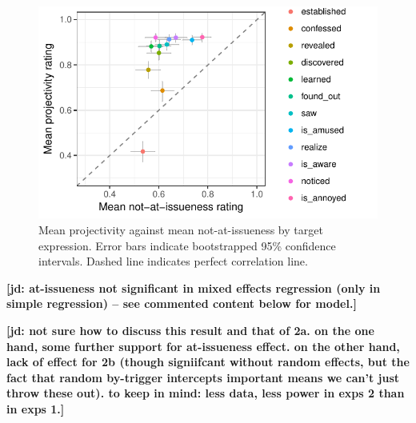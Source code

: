 \documentclass[11pt,fleqn]{article}
\newcommand{\6}{\mbox{$[\hspace*{-.6mm}[$}}
\newcommand{\9}{\mbox{$]\hspace*{-.6mm}]$}}
\newcommand{\jd}[1]{\textbf{\color{Green}[jd: #1]}}
\begin{document}
\begin{figure}[!h]

\begin{center}
\includegraphics[width=12cm]{../results/exp2b/graphs/ai-proj-bytrigger}
\end{center}

\caption{Mean projectivity against mean not-at-issueness by target expression. Error bars indicate bootstrapped 95\% confidence intervals. Dashed line indicates perfect correlation line.}
\label{fig:f-proj-ai-2b}
\end{figure}

\jd{at-issueness not significant in mixed effects regression (only in simple regression) -- see commented content below for model.}


%
%
%
%
%

\jd{not sure how to discuss this result and that of 2a. on the one hand, some further support for at-issueness effect. on the other hand, lack of effect for 2b (though signiifcant without random effects, but the fact that random by-trigger intercepts important means we can't just throw these out). to keep in mind: less data, less power in exps 2 than in exps 1.}
\end{document}
